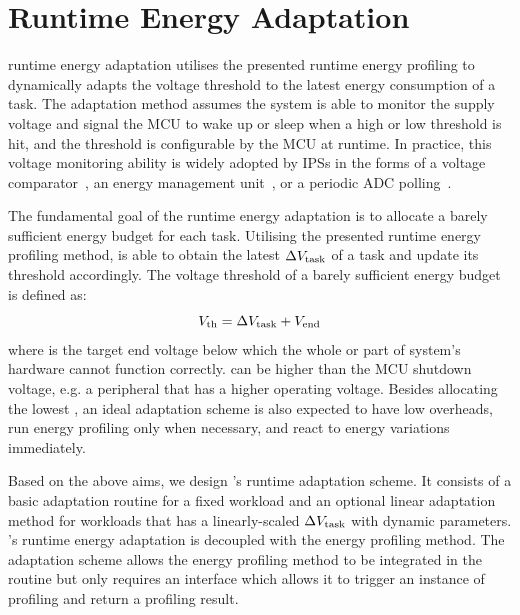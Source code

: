 \section{\nn{} Runtime Energy Adaptation} \label{sec:method2}

\nn{} runtime energy adaptation utilises the presented runtime energy profiling to dynamically adapts the voltage threshold to the latest energy consumption of a task. 
The adaptation method assumes the system is able to monitor the supply voltage and signal the MCU to wake up or sleep when a high or low threshold is hit, and the threshold is configurable by the MCU at runtime. 
In practice, this voltage monitoring ability is widely adopted by IPSs in the forms of a voltage comparator~\cite{kang2018homerun, balsamo2016hibernus++}, an energy management unit~\cite{gomez2016dynamic, maeng2019supporting}, or a periodic ADC polling~\cite{sliper2019efficient}. 

The fundamental goal of the runtime energy adaptation is to allocate a barely sufficient energy budget for each task. 
Utilising the presented runtime energy profiling method, \nn{} is able to obtain the latest $\Delta V_{\text{task}}$ of a task and update its threshold accordingly. 
The voltage threshold  of a barely sufficient energy budget is defined as:
\begin{equation}
    V_{\text{th}} = \Delta V_{\text{task}} + V_{\text{end}}
    \label{eq:vth_definition}
\end{equation}
where  is the target end voltage below which the whole or part of system's hardware cannot function correctly. 
 can be higher than the MCU shutdown voltage, e.g. a peripheral that has a higher operating voltage. 
Besides allocating the lowest , an ideal adaptation scheme is also expected to have low overheads, run energy profiling only when necessary, and react to energy variations immediately.

Based on the above aims, we design \nn{}'s runtime adaptation scheme. 
It consists of a basic adaptation routine for a fixed workload and an optional linear adaptation method for workloads that has a linearly-scaled $\Delta V_{\text{task}}$ with dynamic parameters.
\nn{}'s runtime energy adaptation is decoupled with the energy profiling method. 
The adaptation scheme allows the energy profiling method to be integrated in the routine but only requires an interface which allows it to trigger an instance of profiling and return a profiling result.

